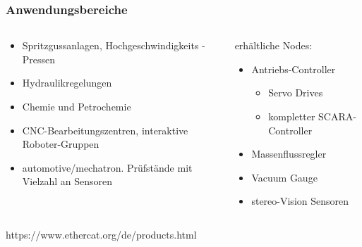 \documentclass[ignorenonframetext,naustrian,12pt,t]{beamer}
\begin{document}
	\begin{frame}
	\frametitle{Anwendungsbereiche}
		\begin{columns}
      \begin{column}{0.5\textwidth}
		\begin{itemize}[label={\color{myTitleColour}\textbullet}]
		\item Spritzgussanlagen, Hochgeschwindigkeits - Pressen 
		\item Hydraulikregelungen 
		\item Chemie und Petrochemie
		\item CNC-Bearbeitungszentren, interaktive Roboter-Gruppen 
		\item automotive/mechatron. Prüfstände mit Vielzahl an Sensoren 
		\end{itemize}
      \end{column}
      \begin{column}{0.5\textwidth}
		erhältliche Nodes:
		\begin{itemize}[label={\color{myTitleColour}\textbullet}]
		\item Antriebs-Controller 
			\begin{itemize}[label={\color{myTitleColour}\textbullet}]
			\item Servo Drives
			\item kompletter SCARA-Controller
		\end{itemize}
		\item Massenflussregler 
		\item Vacuum Gauge
		\item stereo-Vision Sensoren
		\end{itemize}
      \end{column}
   \end{columns}
	\vspace{5mm}
	\centering https://www.ethercat.org/de/products.html
	\end{frame}
\end{document}
